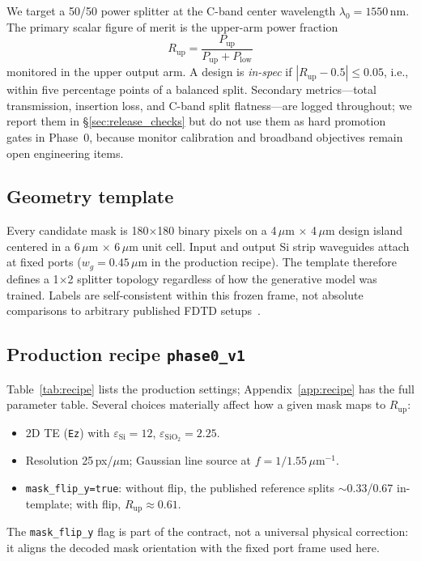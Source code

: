 \documentclass[11pt,a4paper]{article}
\begin{document}
We target a 50/50 power splitter at the C-band center wavelength $\lambda_0 = 1550$\,nm.
The primary scalar figure of merit is the upper-arm power fraction
\begin{equation}
  R_{\mathrm{up}} = \frac{P_{\mathrm{up}}}{P_{\mathrm{up}} + P_{\mathrm{low}}}
\end{equation}
monitored in the upper output arm.
A design is \emph{in-spec} if $|R_{\mathrm{up}} - 0.5| \le 0.05$, i.e., within five percentage points of a balanced split.
Secondary metrics---total transmission, insertion loss, and C-band split flatness---are logged throughout; we report them in \S\ref{sec:release_checks} but do not use them as hard promotion gates in Phase~0, because monitor calibration and broadband objectives remain open engineering items.

\subsection{Geometry template}

Every candidate mask is 180$\times$180 binary pixels on a 4\,$\mu$m $\times$ 4\,$\mu$m design island centered in a 6\,$\mu$m $\times$ 6\,$\mu$m unit cell.
Input and output Si strip waveguides attach at fixed ports ($w_g = 0.45\,\mu\mathrm{m}$ in the production recipe).
The template therefore defines a 1$\times$2 splitter topology regardless of how the generative model was trained.
Labels are self-consistent within this frozen frame, not absolute comparisons to arbitrary published FDTD setups~\cite{Piggott2017InverseDesign}.

\subsection{Production recipe \texttt{phase0\_v1}}

Table~\ref{tab:recipe} lists the production settings; Appendix~\ref{app:recipe} has the full parameter table.
Several choices materially affect how a given mask maps to $R_{\mathrm{up}}$:
\begin{itemize}
  \item 2D TE (\texttt{Ez}) with $\varepsilon_{\mathrm{Si}} = 12$, $\varepsilon_{\mathrm{SiO}_2} = 2.25$.
  \item Resolution 25\,px/$\mu$m; Gaussian line source at $f = 1/1.55\,\mu\mathrm{m}^{-1}$.
  \item \texttt{mask\_flip\_y=true}: without flip, the published reference splits $\sim$0.33/0.67 in-template; with flip, $R_{\mathrm{up}} \approx 0.61$.
\end{itemize}
The \texttt{mask\_flip\_y} flag is part of the contract, not a universal physical correction: it aligns the decoded mask orientation with the fixed port frame used here.
\end{document}
